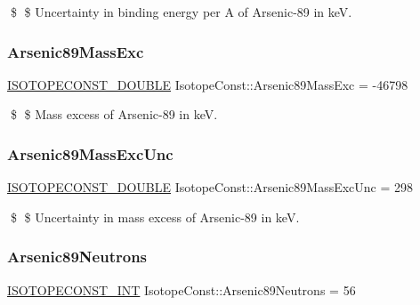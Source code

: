 \$ \$ Uncertainty in binding energy per A of Arsenic-\/89 in keV. \mbox{\label{group___isotope_const-_arsenic-_as89_ga8f0f2e00f2934e9651a47b58ed383f09}} 
\subsubsection{\texorpdfstring{Arsenic89\+Mass\+Exc}{Arsenic89MassExc}}
{\footnotesize\ttfamily \mbox{\hyperlink{group___isotope_const-_macros_ga8f45a7272ce02c0b4c65c44636ed719a}{I\+S\+O\+T\+O\+P\+E\+C\+O\+N\+S\+T\+\_\+\+D\+O\+U\+B\+LE}} Isotope\+Const\+::\+Arsenic89\+Mass\+Exc = -\/46798}

\$ \$ Mass excess of Arsenic-\/89 in keV. \mbox{\label{group___isotope_const-_arsenic-_as89_gaef851d3be98504e5b5edf9a478d57a30}} 
\subsubsection{\texorpdfstring{Arsenic89\+Mass\+Exc\+Unc}{Arsenic89MassExcUnc}}
{\footnotesize\ttfamily \mbox{\hyperlink{group___isotope_const-_macros_ga8f45a7272ce02c0b4c65c44636ed719a}{I\+S\+O\+T\+O\+P\+E\+C\+O\+N\+S\+T\+\_\+\+D\+O\+U\+B\+LE}} Isotope\+Const\+::\+Arsenic89\+Mass\+Exc\+Unc = 298}

\$ \$ Uncertainty in mass excess of Arsenic-\/89 in keV. \mbox{\label{group___isotope_const-_arsenic-_as89_ga178f0b00aff83c2f5f201cd9200b065a}} 
\subsubsection{\texorpdfstring{Arsenic89\+Neutrons}{Arsenic89Neutrons}}
{\footnotesize\ttfamily \mbox{\hyperlink{group___isotope_const-_macros_ga5f18360b3e99483a35c32d789e62621c}{I\+S\+O\+T\+O\+P\+E\+C\+O\+N\+S\+T\+\_\+\+I\+NT}} Isotope\+Const\+::\+Arsenic89\+Neutrons = 56}

